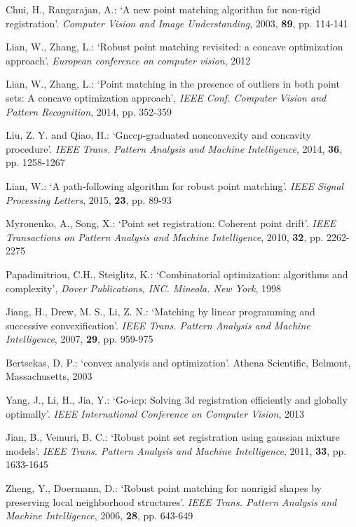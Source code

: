 \documentclass[11pt,bezier,]{article}
\begin{document}
\begin{thebibliography}{}
Chui, H., Rangarajan, A.:
`A new point matching algorithm for non-rigid registration'.
\textit{Computer Vision and Image Understanding},
2003,  \textbf{89}, pp. 114-141

Lian, W., Zhang, L.:
`Robust point matching revisited: a concave optimization approach'. 
\textit{European conference on computer vision}, 2012


Lian, W., Zhang, L.:
`Point matching in the presence of outliers in both point sets: A concave optimization approach',
\textit{IEEE Conf. Computer Vision and Pattern Recognition}, 2014, pp.  352-359


Liu, Z. Y. and Qiao, H.:
`Gnccp-graduated nonconvexity and concavity procedure'. 
\textit{IEEE Trans. Pattern Analysis and Machine Intelligence},
2014,  \textbf{36}, pp. 1258-1267

Lian, W.: 
`A path-following algorithm for robust point matching'. 
\textit{IEEE Signal Processing Letters}, 
2015, \textbf{23}, pp. 89-93

Myronenko, A., Song, X.:
`Point set registration: Coherent point drift'.
\textit{IEEE Transactions on Pattern Analysis and Machine Intelligence},
2010, \textbf{32}, pp. 2262-2275

 Papadimitriou, C.H., Steiglitz, K.:
`Combinatorial optimization: algorithms and complexity',
\textit{Dover Publications, INC. Mineola. New York}, 
1998


Jiang, H.,  Drew, M. S., Li, Z. N.:
`Matching by linear programming and successive convexification'.
\textit{IEEE Trans. Pattern Analysis and Machine Intelligence},
2007, \textbf{29}, pp. 959-975


Bertsekas, D. P.:
`convex analysis and optimization'.
Athena Scientific,
Belmont, Massachusetts, 2003

Yang, J., Li, H., Jia, Y.:
`Go-icp: Solving 3d registration efficiently and globally optimally'.
\textit{IEEE International Conference on Computer Vision}, 
2013

Jian, B., Vemuri, B. C.:
`Robust point set registration using gaussian mixture models'.
\textit{IEEE Trans. Pattern Analysis and Machine Intelligence},
2011, \textbf{33}, pp. 1633-1645

Zheng, Y., Doermann, D.:
`Robust point matching for nonrigid shapes by preserving local neighborhood structures'.
\textit{IEEE Trans. Pattern Analysis and Machine Intelligence},
2006, \textbf{28}, pp. 643-649


\end{thebibliography}
\end{document}
